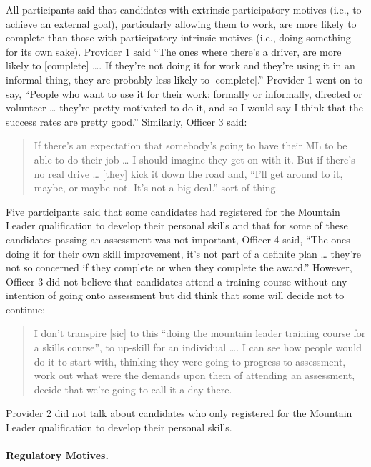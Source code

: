\documentclass[
  12pt,
  a4paper,
]{book}
\begin{document}
All participants said that candidates with extrinsic participatory motives (i.e., to achieve an external goal), particularly allowing them to work, are more likely to complete than those with participatory intrinsic motives (i.e., doing something for its own sake). Provider 1 said ``The ones where there's a driver, are more likely to {[}complete{]} \ldots. If they're not doing it for work and they're using it in an informal thing, they are probably less likely to {[}complete{]}.'' Provider 1 went on to say, ``People who want to use it for their work: formally or informally, directed or volunteer \ldots{} they're pretty motivated to do it, and so I would say I think that the success rates are pretty good.'' Similarly, Officer 3 said:

\begin{quote}
If there's an expectation that somebody's going to have their ML to be able to do their job \ldots{} I should imagine they get on with it. But if there's no real drive \ldots{} {[}they{]} kick it down the road and, ``I'll get around to it, maybe, or maybe not. It's not a big deal.'' sort of thing.
\end{quote}

Five participants said that some candidates had registered for the Mountain Leader qualification to develop their personal skills and that for some of these candidates passing an assessment was not important, Officer 4 said, ``The ones doing it for their own skill improvement, it's not part of a definite plan \ldots{} they're not so concerned if they complete or when they complete the award.'' However, Officer 3 did not believe that candidates attend a training course without any intention of going onto assessment but did think that some will decide not to continue:

\begin{quote}
I don't transpire {[}sic{]} to this ``doing the mountain leader training course for a skills course'', to up-skill for an individual \ldots. I can see how people would do it to start with, thinking they were going to progress to assessment, work out what were the demands upon them of attending an assessment, decide that we're going to call it a day there.
\end{quote}

Provider 2 did not talk about candidates who only registered for the Mountain Leader qualification to develop their personal skills.

\hypertarget{regulatory-motives.}{%
\paragraph{Regulatory Motives.}\label{regulatory-motives.}}
\end{document}

